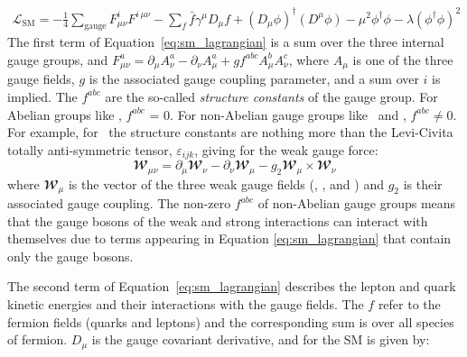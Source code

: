 \begin{align}
	\mathcal{L}_{\text{SM}} = -\frac{1}{4} \sum\limits_{\text{gauge}} \mathit{F}_{\mu \nu}^i \mathit{F}^{i\,\mu\nu}
	- \sum\limits_{f} \bar{f}\gamma^{\mu} \mathit{D}_{\mu} f 
	+  (\mathit{D}_{\mu} \phi)^{\dagger} (\mathit{D}^{\mu} \phi) - \mu^2 \phi^{\dagger}\phi - \lambda(\phi^{\dagger}\phi)^2
	\label{eq:sm_lagrangian}
\end{align}
\noindent
The first term of Equation~\ref{eq:sm_lagrangian} is a sum over the three internal gauge groups,  and $\mathit{F}^a_{\mu \nu} = \partial_{\mu} \mathit{A}_{\nu}^a - \partial_{\nu} \mathit{A}_{\mu}^a + g f^{abc} \mathit{A}_{\mu}^{b}\mathit{A}_{\nu}^{c}$, where $\mathit{A}_{\mu}$ is one of the
three gauge fields, $g$ is the associated gauge coupling parameter, and a sum over $i$ is implied. The $f^{abc}$ are the so-called
\textit{structure constants} of the gauge group. For Abelian groups like \Uone, $f^{abc}$ = 0.
For non-Abelian gauge groups like \SUtwo~and \SUthree, $f^{abc} \ne 0$. For example, for
\SUtwo~the structure constants are nothing more than the Levi-Civita totally anti-symmetric tensor, 
$\varepsilon_{ijk}$, giving for the weak gauge force:
\begin{equation}
	\mathbfcal{W}_{\mu \nu} = \partial_{\mu} \mathbfcal{W}_{\nu} - \partial_{\nu} \mathbfcal{W}_{\mu} - g_2 \mathbfcal{W}_{\mu} \times \mathbfcal{W}_{\nu}
\end{equation}
where $\mathbfcal{W}_{\mu}$ is the vector of the three weak gauge fields (\fieldWone, \fieldWtwo, and \fieldWthree) and $g_2$ is their associated gauge coupling. The non-zero $f^{abc}$ of non-Abelian gauge groups means that the gauge bosons of
the weak and strong interactions can interact with themselves due to terms appearing in Equation
\ref{eq:sm_lagrangian} that contain only the gauge bosons. %

The second term of Equation~\ref{eq:sm_lagrangian} describes the lepton and quark kinetic energies and their interactions with the gauge fields.
The $f$ refer to the fermion fields (quarks and leptons) and the corresponding sum is over all
species of fermion. $\mathit{D}_{\mu}$ is the gauge covariant derivative, and for the SM is
given by:

